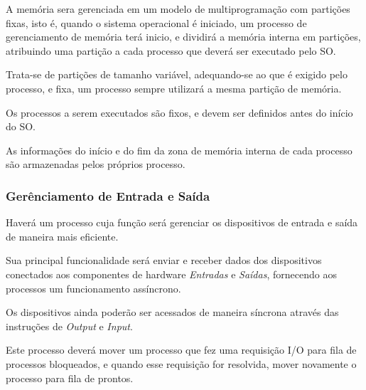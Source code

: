 A memória sera gerenciada em um modelo de multiprogramação com partições fixas, isto é, quando o sistema operacional é iniciado, um processo de gerenciamento de memória terá inicio, e dividirá a memória interna em partições, atribuindo uma partição a cada processo que deverá ser executado pelo SO.

Trata-se de partições de tamanho variável, adequando-se ao que é exigido pelo processo, e fixa, um processo sempre utilizará a mesma partição de memória.

Os processos a serem executados são fixos, e devem ser definidos antes do início do SO.

As informações do início e do fim da zona de memória interna de cada processo são armazenadas pelos próprios processo.

\subsubsection{Gerênciamento de Entrada e Saída}

Haverá um processo cuja função será gerenciar os dispositivos de entrada e saída de maneira mais eficiente.

Sua principal funcionalidade será enviar e receber dados dos dispositivos conectados aos componentes de hardware \textit{Entradas} e \textit{Saídas}, fornecendo aos processos um funcionamento assíncrono.

Os dispositivos ainda poderão ser acessados de maneira síncrona através das instruções de \textit{Output} e \textit{Input}.

Este processo deverá mover um processo que fez uma requisição I/O para fila de processos bloqueados, e quando esse requisição for resolvida, mover novamente o processo para fila de prontos.